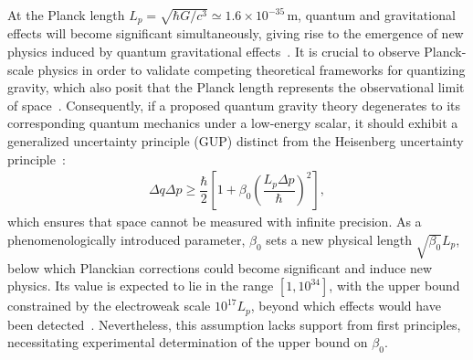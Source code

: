 \documentclass[aps,prl,twocolumn,superscriptaddress]{revtex4-2}
\begin{document}
\date{\today}%
\begin{abstract}
A tenet of contemporary physics is that novel physics beyond the Standard Model lurks at a scale related to the Planck length. The development and validation of a unified framework that merges general relativity and quantum physics is contingent upon the observation of Planck-scale physics. Here, we present a fully quantum model for measuring the nonstationary dynamics of a ng-mass mechanical resonator, which will slightly deviate from the predictions of standard quantum mechanics induced by modified commutation relations associated with quantum gravity effects at low-energy scalar. The deformed commutator is quantified by the oscillation frequency deviation, which is amplified by the nonlinear mechanism of the detection field. The measurement resolution is optimized to  a precision level that is $15$ orders of magnitude below the electroweak scale. 
\end{abstract}
\maketitle
At the Planck length $L_p=\sqrt{\hbar G/c^3}\simeq 1.6\times 10^{-35}$\,m, quantum and gravitational effects will become significant simultaneously, giving rise to the emergence of new physics induced by quantum gravitational effects~\cite{Stephen}. It is crucial to observe Planck-scale physics in order to validate competing theoretical frameworks for quantizing gravity, which also posit that the Planck length represents the observational limit of space~\cite{Hossenfelder2013}. Consequently, if a proposed quantum gravity theory degenerates to its corresponding quantum mechanics under a low-energy scalar, it should exhibit a generalized uncertainty principle (GUP) distinct from the Heisenberg uncertainty principle~\cite{Hossenfelder2013,Amati1987}:
\begin{equation}
\begin{split}
\Delta q\Delta p\geq\dfrac{\hbar}{2}\left[1+\beta_0\left(\dfrac{L_p\Delta p}{\hbar}\right)^2\right],
\end{split}
\label{eq:GUP }
\end{equation}
which ensures that space cannot be measured with infinite precision. As a phenomenologically introduced parameter, $\beta_0$ sets a new physical length $\sqrt{\beta_0}L_p$, below which Planckian corrections could become significant and induce new physics. Its value is expected to lie in the range $[1, 10^{34}]$, with the upper bound constrained by the electroweak scale $10^{17}L_p$, beyond which effects would have been detected~\cite{Das2008}.  Nevertheless, this assumption lacks support from first principles, necessitating experimental determination of the upper bound on $\beta_0$. 
\end{document}
